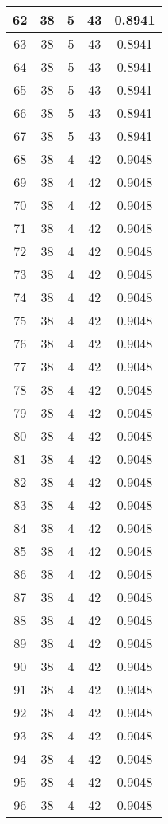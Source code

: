 \documentclass[letterpaper, 12pt]{article}
\begin{document}
\begin{longtable}{|c|c|c|c|c|}
\hline
62 & 38 & 5 & 43 & 0.8941 \\
\hline
63 & 38 & 5 & 43 & 0.8941 \\
\hline
64 & 38 & 5 & 43 & 0.8941 \\
\hline
65 & 38 & 5 & 43 & 0.8941 \\
\hline
66 & 38 & 5 & 43 & 0.8941 \\
\hline
67 & 38 & 5 & 43 & 0.8941 \\
\hline
68 & 38 & 4 & 42 & 0.9048 \\
\hline
69 & 38 & 4 & 42 & 0.9048 \\
\hline
70 & 38 & 4 & 42 & 0.9048 \\
\hline
71 & 38 & 4 & 42 & 0.9048 \\
\hline
72 & 38 & 4 & 42 & 0.9048 \\
\hline
73 & 38 & 4 & 42 & 0.9048 \\
\hline
74 & 38 & 4 & 42 & 0.9048 \\
\hline
75 & 38 & 4 & 42 & 0.9048 \\
\hline
76 & 38 & 4 & 42 & 0.9048 \\
\hline
77 & 38 & 4 & 42 & 0.9048 \\
\hline
78 & 38 & 4 & 42 & 0.9048 \\
\hline
79 & 38 & 4 & 42 & 0.9048 \\
\hline
80 & 38 & 4 & 42 & 0.9048 \\
\hline
81 & 38 & 4 & 42 & 0.9048 \\
\hline
82 & 38 & 4 & 42 & 0.9048 \\
\hline
83 & 38 & 4 & 42 & 0.9048 \\
\hline
84 & 38 & 4 & 42 & 0.9048 \\
\hline
85 & 38 & 4 & 42 & 0.9048 \\
\hline
86 & 38 & 4 & 42 & 0.9048 \\
\hline
87 & 38 & 4 & 42 & 0.9048 \\
\hline
88 & 38 & 4 & 42 & 0.9048 \\
\hline
89 & 38 & 4 & 42 & 0.9048 \\
\hline
90 & 38 & 4 & 42 & 0.9048 \\
\hline
91 & 38 & 4 & 42 & 0.9048 \\
\hline
92 & 38 & 4 & 42 & 0.9048 \\
\hline
93 & 38 & 4 & 42 & 0.9048 \\
\hline
94 & 38 & 4 & 42 & 0.9048 \\
\hline
95 & 38 & 4 & 42 & 0.9048 \\
\hline
96 & 38 & 4 & 42 & 0.9048 \\

\end{longtable}
\end{document}
